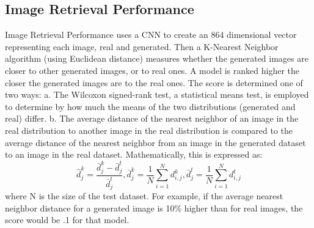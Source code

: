 
\subsection{Image Retrieval Performance}
\label{sub:image_retrieval_performance}

Image Retrieval Performance uses a CNN to create an 864 dimensional vector representing each image, real and generated. Then a K-Nearest Neighbor algorithm (using Euclidean distance) measures whether the generated images are closer to other generated images, or to real ones. A model is ranked higher the closer the generated images are to the real ones. 
The score is determined one of two ways:
a. The Wilcoxon signed-rank test, a statistical means test, is employed to determine by how much the means of the two distributions (generated and real) differ. 
b. The average distance of the nearest neighbor of an image in the real distribution to another image in the real distribution is compared to the average distance of the nearest neighbor from an image in the generated dataset to an image in the real dataset. Mathematically, this is expressed as:
\begin{equation}
	\hat{d}_j^k = \frac{\bar{d}_j^k - \bar{d}_j^t}{\bar{d}_j^t}, \bar{d}_j^k = \frac{1}{N}\sum_{i=1}^{N}{d_{i,j}^k}, \bar{d}_j^t = \frac{1}{N}\sum_{i=1}^{N}{d_{i,j}^t}
\end{equation}
where N is the size of the test dataset. For example, if the average nearest neighbor distance for a generated image is 10\% higher than for real images, the score would be .1 for that model.